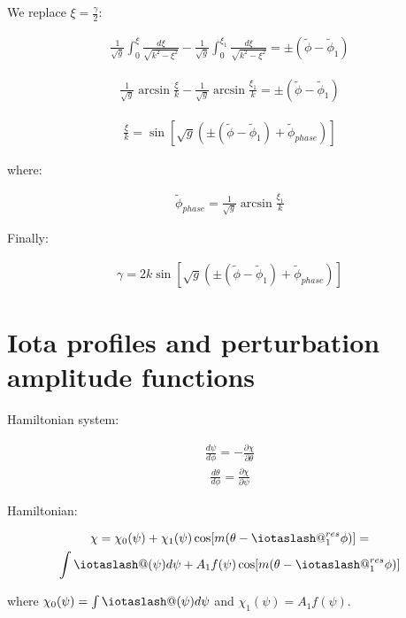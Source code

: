\documentclass[11pt,a4paper,oneside]{article}
\makeatletter
\newcommand{\iotaslash}{{\mathpalette\iotaslash@\relax}}
\newcommand{\iotaslash@}[2]{
  \raisebox{-0.6\height}[0pt][0pt]{%
    \rotatebox[origin=Bl]{15}{$\m@th#1{\mkern-1mu\mathchar'26}$}%
  }%
  \mkern-9.5mu\nonscript\mkern-1mu
  \iota
  \mkern1mu
}
\makeatother
\begin{document}
We replace $\xi= \frac{\gamma}{2}$:

\begin{align}
\frac{1}{\sqrt{g}}\int_{0}^\xi\frac{d \xi}{\sqrt{k^2-\xi^2}}-\frac{1}{\sqrt{g}}\int_0^{\xi_1}\frac{d \xi}{\sqrt{k^2-\xi^2}}=\pm(\tilde{\phi}-\tilde{\phi}_1)
\end{align}

\begin{align}
\frac{1}{\sqrt{g}}\arcsin{\frac{\xi}{k}}-\frac{1}{\sqrt{g}}\arcsin{\frac{\xi_1}{k}}=\pm(\tilde{\phi}-\tilde{\phi}_1)
\end{align}

\begin{align}
\frac{\xi}{k}=\sin{[\sqrt{g}(\pm(\tilde{\phi}-\tilde{\phi}_1)+\tilde{\phi}_{phase})]}
\end{align}

where:

\begin{align}
\tilde{\phi}_{phase} =\frac{1}{\sqrt{g}}\arcsin{\frac{\xi_1}{k}}
\end{align}

Finally:

\begin{align}
\gamma=2k\sin{[\sqrt{g}(\pm(\tilde{\phi}-\tilde{\phi}_1)+\tilde{\phi}_{phase})]}
\end{align}

\section{Iota profiles and perturbation amplitude functions}

Hamiltonian system:

\begin{align}
\frac{d \psi}{d\phi}=-\frac{\partial \chi}{\partial\theta}
\end{align}
\begin{align}
\frac{d \theta}{d\phi}=\frac{\partial \chi}{\partial\psi}
\end{align}

Hamiltonian:

\begin{multline}
\chi=\chi_0(\psi)+\chi_1(\psi)\cos[m(\theta-\iotaslash^{res}_1\phi)]=\\
\int\iotaslash(\psi)d\psi+A_1f(\psi)\cos[m(\theta-\iotaslash^{res}_1\phi)]
\end{multline}

where $\chi_0(\psi)=\int\iotaslash(\psi)d\psi$ and $\chi_1(\psi)=A_1f(\psi)$.
\end{document}
